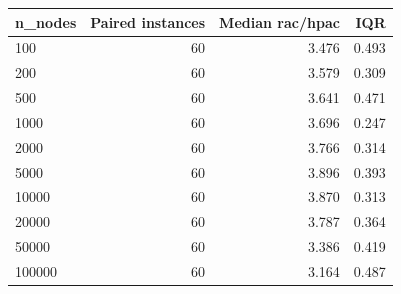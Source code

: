 \begin{tabular}{lrrr}
\toprule
n\_nodes & Paired instances & Median rac/hpac & IQR \\
\midrule
100 & 60 & 3.476 & 0.493 \\
200 & 60 & 3.579 & 0.309 \\
500 & 60 & 3.641 & 0.471 \\
1000 & 60 & 3.696 & 0.247 \\
2000 & 60 & 3.766 & 0.314 \\
5000 & 60 & 3.896 & 0.393 \\
10000 & 60 & 3.870 & 0.313 \\
20000 & 60 & 3.787 & 0.364 \\
50000 & 60 & 3.386 & 0.419 \\
100000 & 60 & 3.164 & 0.487 \\
\bottomrule
\end{tabular}
